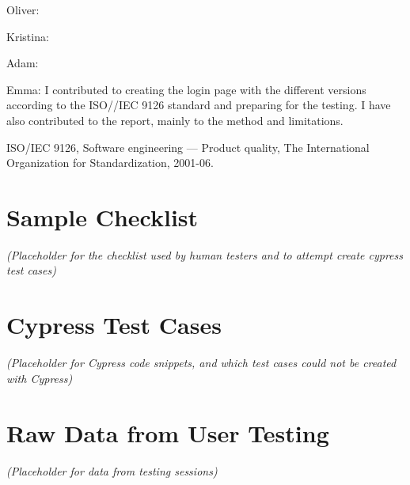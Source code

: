 \documentclass[journal,twocolumn]{IEEEtran}
\begin{document}
Oliver:

Kristina:

Adam:

Emma: I contributed to creating the login page with the different versions according to the ISO//IEC 9126 standard and preparing for the testing. I have also contributed to the report, mainly to the method and limitations.



\begin{thebibliography}{9}
     ISO/IEC 9126, Software engineering — Product quality, The International Organization for Standardization, 2001-06.
\end{thebibliography}

\appendices
\section{Sample Checklist}
\textit{(Placeholder for the checklist used by human testers and to attempt create cypress test cases)}

\section{Cypress Test Cases}
\textit{(Placeholder for Cypress code snippets, and which test cases could not be created with Cypress)}

\section{Raw Data from User Testing}
\textit{(Placeholder for data from testing sessions)}
\end{document}
